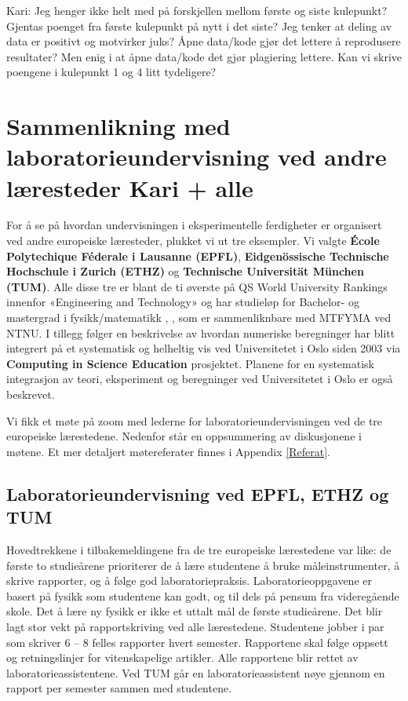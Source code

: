 \documentclass{article}
\begin{document}
\begin{itemize}
  {\color{red} Kari: Jeg henger ikke helt med på forskjellen mellom første og siste kulepunkt? Gjentas poenget fra første kulepunkt på nytt i det siste? Jeg tenker at deling av data er positivt og motvirker juks? Åpne data/kode gjør det lettere å reprodusere resultater? Men enig i at åpne data/kode det gjør plagiering lettere. Kan vi skrive poengene i kulepunkt 1 og 4 litt tydeligere? }
\end{itemize}

\section{Sammenlikning med laboratorieundervisning ved andre læresteder {\color{red} Kari + alle}}
For å se på hvordan undervisningen i eksperimentelle ferdigheter er organisert ved andre europeiske læresteder, plukket vi ut tre eksempler. Vi valgte {\bf École Polytechique Féderale i Lausanne (EPFL)}, {\bf Eidgenössische Technische Hochschule i Zurich (ETHZ)} og {\bf Technische Universität München (TUM)}. Alle disse tre er blant de ti øverste på QS World University Rankings innenfor «Engineering and Technology» og har studieløp for Bachelor- og mastergrad i fysikk/matematikk \cite{ETHZprog}, \cite{EPFLprog}, \cite{TUMprog} som er sammenliknbare med MTFYMA ved NTNU.  I tillegg følger en beskrivelse av hvordan numeriske beregninger har blitt integrert på et systematisk og helheltig vis ved Universitetet i Oslo siden 2003 via {\bf Computing in Science Education} prosjektet. Planene for en systematisk integrasjon av teori, eksperiment og beregninger ved Universitetet  i Oslo er også beskrevet.

Vi fikk et møte på zoom med lederne for laboratorieundervisningen ved de tre europeiske lærestedene. Nedenfor står en oppsummering av diskusjonene i møtene. Et mer detaljert møtereferater finnes i Appendix \ref{Referat}. 

\subsection{Laboratorieundervisning ved EPFL, ETHZ og TUM}

Hovedtrekkene i tilbakemeldingene fra de tre europeiske lærestedene var like: de første to studieårene prioriterer de å lære studentene å bruke måleinstrumenter, å skrive rapporter, og å følge god laboratoriepraksis. Laboratorieoppgavene er basert på fysikk som studentene kan godt, og til dels på pensum fra videregående skole. Det å lære ny fysikk er ikke et uttalt mål de første studieårene. Det blir lagt stor vekt på rapportskriving ved alle lærestedene. Studentene jobber i par som skriver 6 – 8 felles rapporter hvert semester. Rapportene skal følge oppsett og retningslinjer for vitenskapelige artikler. Alle rapportene blir rettet av laboratorieassistentene. Ved TUM går en laboratorieassistent nøye gjennom en rapport per semester sammen med studentene. 
\end{document}
